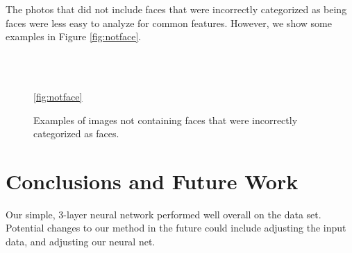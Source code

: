 \documentclass[11pt]{article}
\begin{document}
The photos that did not include faces that were incorrectly categorized as being faces were less easy to analyze for common features. However, we show some examples in Figure \ref{fig:notface}.
 
 \begin{figure}[ht!]
     \begin{center}
%
        \\%
        \\%
    \end{center}
    \caption{%
        Examples of images not containing faces that were incorrectly categorized as faces. 
     }\ref{fig:notface}%
\end{figure}

\section{Conclusions and Future Work}

Our simple, 3-layer neural network performed well overall on the data set. Potential changes to our method in the future could include adjusting the input data, and adjusting our neural net.
\end{document}

